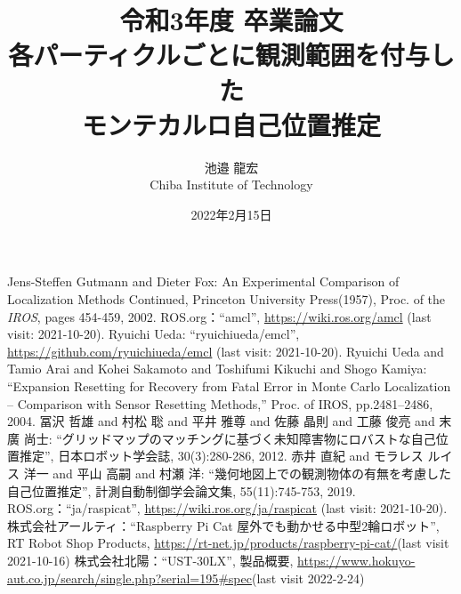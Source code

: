 \documentclass[a4paper,11pt]{jsbook}
\begin{document}
\title{令和3年度 卒業論文\\
各パーティクルごとに観測範囲を付与した\\モンテカルロ自己位置推定}

\author{池邉 龍宏 \\
Chiba Institute of Technology}

\date{2022年2月15日}

\maketitle



\tableofcontents



\cleardoublepage
{}
 






\appendix


% 
% 

\begin{thebibliography}{99}

    Jens-Steffen Gutmann and Dieter Fox: An Experimental Comparison of Localization Methods Continued, 
    Princeton University Press(1957), Proc. of the \textit{IROS}, pages 454-459, 2002.
    ROS.org：``amcl'', \url{https://wiki.ros.org/amcl} (last visit: 2021-10-20).
    Ryuichi Ueda: ``ryuichiueda/emcl'', \url{https://github.com/ryuichiueda/emcl} (last visit: 2021-10-20). 
    Ryuichi Ueda and Tamio Arai and Kohei Sakamoto and Toshifumi Kikuchi and Shogo Kamiya: 
    ``Expansion Resetting for Recovery from Fatal Error in Monte Carlo Localization -- Comparison with Sensor Resetting Methods,'' Proc. of IROS, pp.2481--2486, 2004.  
    冨沢 哲雄 and 村松 聡 and 平井 雅尊 and 佐藤 晶則 and 工藤 俊亮 and 末廣 尚士:
    ``グリッドマップのマッチングに基づく未知障害物にロバストな自己位置推定'', 日本ロボット学会誌, 30(3):280-286, 2012.
    赤井 直紀 and モラレス ルイス 洋一 and 平山 高嗣 and 村瀬 洋:
    ``幾何地図上での観測物体の有無を考慮した自己位置推定'', 計測自動制御学会論文集, 55(11):745-753, 2019.
    ROS.org：``ja/raspicat'', \url{https://wiki.ros.org/ja/raspicat} (last visit: 2021-10-20). 
    株式会社アールティ：``Raspberry Pi Cat 屋外でも動かせる中型2輪ロボット'', 
    RT Robot Shop Products, \url{https://rt-net.jp/products/raspberry-pi-cat/}(last visit 2021-10-16)
    株式会社北陽：``UST-30LX'', 
    製品概要, \url{https://www.hokuyo-aut.co.jp/search/single.php?serial=195#spec}(last visit 2022-2-24)
  \end{thebibliography}

\newpage
\printindex
\end{document}
